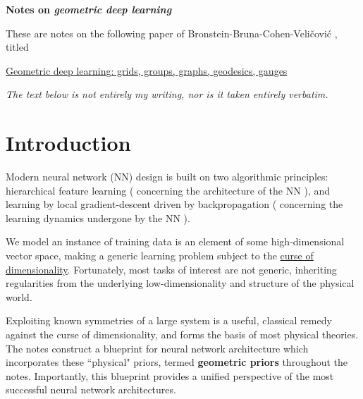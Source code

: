 \documentclass[12pt]{article}
\numberwithin{equation}{section}
\theoremstyle{definition}
\newcommand{		\four		}	{	\vspace{4mm}				}%
\newcommand{		\n		}	{	\noindent					} %
\newcommand{		\B		}	{\textbf					} %
\newcommand{		\1		}	{	\bm{1}					}%
\begin{document}




\author{}


\four

\vspace{5mm}
\begin{centering}
\textbf{Notes on \emph{geometric deep learning}}
\end{centering}
\vspace{5mm}

These are notes on the following paper of Bronstein-Bruna-Cohen-Veli\v{c}ovi\'c \cite{BBCV21}, titled

\vspace{5mm}

\begin{centering}

\href{https://arxiv.org/abs/2104.13478}{Geometric deep learning: grids, groups, graphs, geodesics, gauges}

\end{centering}

\vspace{5mm}

\emph{The text below is not entirely my writing, nor is it taken entirely verbatim.}

\tableofcontents

\n\hrulefill

\newpage

\section{Introduction}



Modern neural network (NN) design is built on two algorithmic principles: hierarchical feature learning ( concerning the architecture of the NN ), and learning by local gradient-descent driven by backpropagation ( concerning the learning dynamics undergone by the NN ). 

We model an instance of training data is an element of some high-dimensional vector space, making a generic learning problem subject to the \href{https://en.wikipedia.org/wiki/Curse_of_dimensionality}{curse of dimensionality}. Fortunately, most tasks of interest are not generic, inheriting regularities from the underlying low-dimensionality and structure of the physical world.

Exploiting known symmetries of a large system is a useful, classical remedy against the curse of dimensionality, and forms the basis of most physical theories. The notes \cite{BBCV21} construct a blueprint for neural network architecture which incorporates these ``physical" priors, termed \B{geometric priors} throughout the notes. Importantly, this blueprint provides a unified perspective of the most successful neural network architectures.
\end{document}
